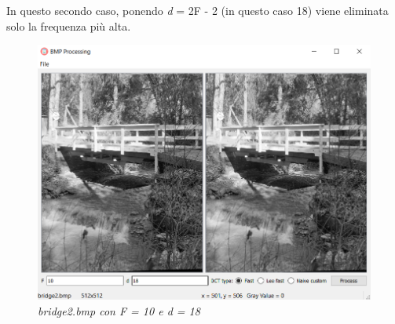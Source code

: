 \documentclass[a4paper,12pt]{report}
\begin{document}
\noindent In questo secondo caso, ponendo \textit{d} = 2F - 2 (in questo caso 18) viene eliminata solo la frequenza più alta.

\begin{figure}[H]
\centering
\includegraphics[width=0.6\linewidth]{../img/bridge2_10_18.png}
\caption{\textit{bridge2.bmp con F = 10 e d = 18}}
\end{figure}
\printbibliography
\end{document}
